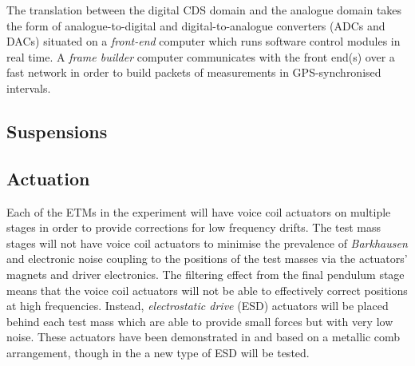 The translation between the digital \gls{CDS} domain and the analogue domain takes the form of analogue-to-digital and digital-to-analogue converters (\glspl{ADC} and \glspl{DAC}) situated on a \emph{front-end} computer which runs software control modules in real time. A \emph{frame builder} computer communicates with the front end(s) over a fast network in order to build packets of measurements in \gls{GPS}-synchronised intervals.

\subsection{Suspensions}

\subsection{Actuation}
Each of the \glspl{ETM} in the experiment will have voice coil actuators on multiple stages in order to provide corrections for low frequency drifts. The test mass stages will not have voice coil actuators to minimise the prevalence of \emph{Barkhausen} \cite{Weiss2008} and electronic noise coupling to the positions of the test masses via the actuators' magnets and driver electronics. The filtering effect from the final pendulum stage means that the voice coil actuators will not be able to effectively correct positions at high frequencies. Instead, \emph{electrostatic drive} (\gls{ESD}) actuators will be placed behind each test mass which are able to provide small forces but with very low noise. These actuators have been demonstrated in \GEO{} \cite{Hewitson2007} and \ALIGO{} \cite{Aston2012} based on a metallic comb arrangement, though in the \SSMEXPT{} a new type of \gls{ESD} will be tested.

